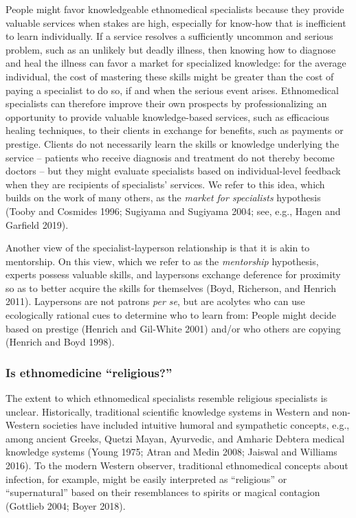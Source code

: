 \documentclass[
  11pt,
]{article}
\begin{document}
People might favor knowledgeable ethnomedical specialists because they provide valuable services when stakes are high, especially for know-how that is inefficient to learn individually. If a service resolves a sufficiently uncommon and serious problem, such as an unlikely but deadly illness, then knowing how to diagnose and heal the illness can favor a market for specialized knowledge: for the average individual, the cost of mastering these skills might be greater than the cost of paying a specialist to do so, if and when the serious event arises. Ethnomedical specialists can therefore improve their own prospects by professionalizing an opportunity to provide valuable knowledge-based services, such as efficacious healing techniques, to their clients in exchange for benefits, such as payments or prestige. Clients do not necessarily learn the skills or knowledge underlying the service -- patients who receive diagnosis and treatment do not thereby become doctors -- but they might evaluate specialists based on individual-level feedback when they are recipients of specialists' services. We refer to this idea, which builds on the work of many others, as the \emph{market for specialists} hypothesis (Tooby and Cosmides 1996; Sugiyama and Sugiyama 2004; see, e.g., Hagen and Garfield 2019).

Another view of the specialist-layperson relationship is that it is akin to mentorship. On this view, which we refer to as the \emph{mentorship} hypothesis, experts possess valuable skills, and laypersons exchange deference for proximity so as to better acquire the skills for themselves (Boyd, Richerson, and Henrich 2011). Laypersons are not patrons \emph{per se}, but are acolytes who can use ecologically rational cues to determine who to learn from: People might decide based on prestige (Henrich and Gil-White 2001) and/or who others are copying (Henrich and Boyd 1998).

\hypertarget{is-ethnomedicine-religious}{%
\subsubsection{Is ethnomedicine ``religious?''}\label{is-ethnomedicine-religious}}

The extent to which ethnomedical specialists resemble religious specialists is unclear. Historically, traditional scientific knowledge systems in Western and non-Western societies have included intuitive humoral and sympathetic concepts, e.g., among ancient Greeks, Quetzi Mayan, Ayurvedic, and Amharic Debtera medical knowledge systems (Young 1975; Atran and Medin 2008; Jaiswal and Williams 2016). To the modern Western observer, traditional ethnomedical concepts about infection, for example, might be easily interpreted as ``religious'' or ``supernatural'' based on their resemblances to spirits or magical contagion (Gottlieb 2004; Boyer 2018).
\end{document}
